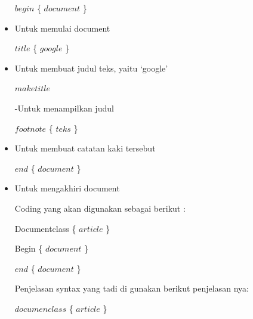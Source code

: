 \begin{itemize}
$begin$ \{ $document$ \} \par

\vspace{\baselineskip}
	\item Untuk memulai document\par

$title$ \{ $google$ \} \par

\vspace{\baselineskip}
	\item Untuk membuat judul teks, yaitu ‘google’\par

$maketitle$\par

\vspace{\baselineskip}
-Untuk menampilkan judul\par

\vspace{\baselineskip}
$footnote$ \{ $teks$ \} \par

\vspace{\baselineskip}
	\item Untuk membuat catatan kaki tersebut\par

\vspace{\baselineskip}
$end$ \{ $document$ \} \par
	\item Untuk mengakhiri document\par

\vspace{\baselineskip}
Coding yang akan digunakan sebagai berikut :\par

\vspace{\baselineskip}
Documentclass \{ $article$ \} \par

\vspace{\baselineskip}
Begin \{ $document$ \} \par

\vspace{\baselineskip}
$end$ \{ $document$ \} \par

\vspace{\baselineskip}
Penjelasan syntax yang tadi di gunakan berikut penjelasan nya:\par

\vspace{\baselineskip}
$documenclass$ \{ $article$ \} \par


\end{itemize}
